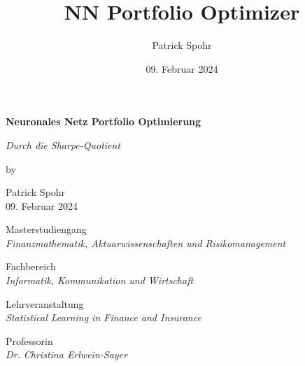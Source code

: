 \documentclass[12pt]{article}
\title{NN Portfolio Optimizer}
\date{09. Februar 2024}
\author{Patrick Spohr}
\begin{document}
    \begin{titlepage}
        
        \centering
        \Huge \textbf{Neuronales Netz Portfolio Optimierung}

        \vspace{7mm}
        
        \centering
        \Large \textit{Durch die Sharpe-Quotient} 

        \vspace{7mm}

        \centering
        \large by

        \vspace{7mm}

        \large Patrick Spohr
        \vspace{2mm}
        \\ 09. Februar 2024

        \vspace{30mm}

        \centering
        \large Masterstudiengang
        \vspace{1mm}
        \\ \normalsize \textit{Finanzmathematik, Aktuarwissenschaften und Risikomanagement} 

        \vspace{5mm}

        \centering
        \large Fachbereich
        \vspace{1mm}
        \\ \normalsize \textit{Informatik, Kommunikation und Wirtschaft} 

        \vspace{5mm}

        \centering
        \large Lehrveranstaltung 
        \vspace{1mm}       
        \\ \normalsize \textit{Statistical Learning in Finance and Insurance} 

        \vspace{5mm}

        \centering
        \large Professorin
        \vspace{1mm}
        \\ \normalsize \textit{Dr. Christina Erlwein-Sayer} 


    \end{titlepage}

    \tableofcontents
    \newpage
\end{document}
